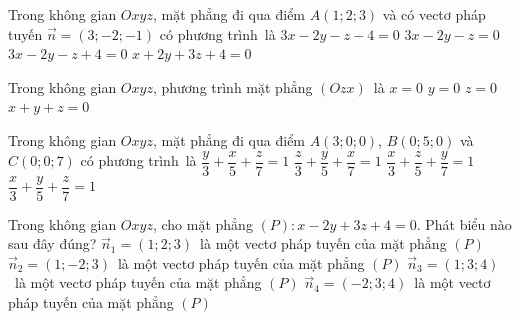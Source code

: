 \begin{ex}%
	Trong  không gian $Oxyz$, mặt phẳng đi qua điểm $A\left(1;2;3 \right)$ và có vectơ pháp tuyến $\overrightarrow{n}=\left(3;-2;-1 \right)$ có phương trình~là
	\choice 
		{$3x-2y-z-4=0$} 
		 {$3x-2y-z=0$}
		{\True  $3x-2y-z+4=0$}
		 {$x+2y+3z+4=0$}
\end{ex}

\begin{ex}%
	 Trong không gian $Oxyz$, phương trình mặt phẳng $\left(Ozx \right)$~là
	\choice 
		 {$x=0$}
		 {\True $y=0$}
		{$z=0$} 
		{$x+y+z=0$} 
\end{ex}

\begin{ex}%
	Trong không  gian $Oxyz$, mặt phẳng đi qua điểm ${A}\left(3;0;0\right)$, ${B}\left(0;5;0\right)$ và ${C}\left(0;0;7\right)$ có phương trình~là
	\choice 
		{$\dfrac{y}{3}+\dfrac{x}{5}+\dfrac{z}{7}=1$} 
		 {$\dfrac{z}{3}+\dfrac{y}{5}+\dfrac{x}{7}=1$}
		{$\dfrac{x}{3}+\dfrac{z}{5}+\dfrac{y}{7}=1$} 
		{\True  $\dfrac{x}{3}+\dfrac{y}{5}+\dfrac{z}{7}=1$}
\end{ex}

\begin{ex}%
	Trong không gian $Oxyz$, cho mặt phẳng $\left(P \right)\colon x-2y+3z+4=0$. Phát biểu nào sau đây  đúng?
	 \choice
		{$\overrightarrow{n}_1=\left(1;2;3 \right)$~là một vectơ pháp tuyến của mặt  phẳng $\left(P \right)$}
		{\True $\overrightarrow{n}_2=\left(1;-2;3 \right)$~là  một vectơ pháp tuyến của mặt phẳng $\left(P \right)$}
		{$\overrightarrow{n}_3=\left(1;3;4 \right)$~là một vectơ  pháp tuyến của mặt phẳng $\left(P \right)$}
		{$\overrightarrow{n}_4=\left(-2;3;4 \right)$~là một vectơ  pháp tuyến của mặt phẳng $\left(P \right)$}
\end{ex}

